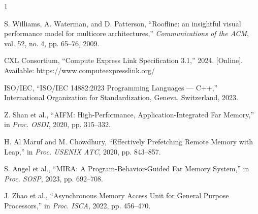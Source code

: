 \documentclass[10pt,conference]{IEEEtran}
\begin{document}
\begin{thebibliography}{1}

S. Williams, A. Waterman, and D. Patterson, ``Roofline: an insightful visual performance model for multicore architectures,'' \emph{Communications of the ACM}, vol. 52, no. 4, pp. 65--76, 2009.

CXL Consortium, ``Compute Express Link Specification 3.1,'' 2024. [Online]. Available: https://www.computeexpresslink.org/

ISO/IEC, ``ISO/IEC 14882:2023 Programming Languages — C++,'' International Organization for Standardization, Geneva, Switzerland, 2023.

Z. Shan et al., ``AIFM: High-Performance, Application-Integrated Far Memory,'' in \emph{Proc. OSDI}, 2020, pp. 315--332.

H. Al Maruf and M. Chowdhury, ``Effectively Prefetching Remote Memory with Leap,'' in \emph{Proc. USENIX ATC}, 2020, pp. 843--857.

S. Angel et al., ``MIRA: A Program-Behavior-Guided Far Memory System,'' in \emph{Proc. SOSP}, 2023, pp. 692--708.

J. Zhao et al., ``Asynchronous Memory Access Unit for General Purpose Processors,'' in \emph{Proc. ISCA}, 2022, pp. 456--470.

\end{thebibliography}
\end{document}
